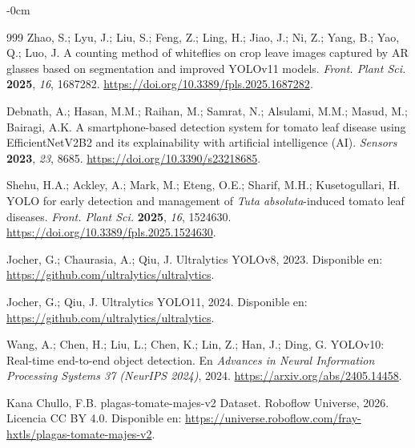 \documentclass[sensors,article,submit,pdftex,moreauthors]{Definitions/mdpi}
\begin{document}
\begin{adjustwidth}{-\extralength}{0cm}
\begin{thebibliography}{999}
Zhao, S.; Lyu, J.; Liu, S.; Feng, Z.; Ling, H.; Jiao, J.; Ni, Z.; Yang, B.; Yao, Q.; Luo, J. A counting method of whiteflies on crop leave images captured by AR glasses based on segmentation and improved YOLOv11 models. {\em Front. Plant Sci.} {\bf 2025}, {\em 16}, 1687282. \url{https://doi.org/10.3389/fpls.2025.1687282}.

Debnath, A.; Hasan, M.M.; Raihan, M.; Samrat, N.; Alsulami, M.M.; Masud, M.; Bairagi, A.K. A smartphone-based detection system for tomato leaf disease using EfficientNetV2B2 and its explainability with artificial intelligence (AI). {\em Sensors} {\bf 2023}, {\em 23}, 8685. \url{https://doi.org/10.3390/s23218685}.

Shehu, H.A.; Ackley, A.; Mark, M.; Eteng, O.E.; Sharif, M.H.; Kusetogullari, H. YOLO for early detection and management of \emph{Tuta absoluta}-induced tomato leaf diseases. {\em Front. Plant Sci.} {\bf 2025}, {\em 16}, 1524630. \url{https://doi.org/10.3389/fpls.2025.1524630}.

Jocher, G.; Chaurasia, A.; Qiu, J. Ultralytics YOLOv8, 2023. Disponible en: \url{https://github.com/ultralytics/ultralytics}.

Jocher, G.; Qiu, J. Ultralytics YOLO11, 2024. Disponible en: \url{https://github.com/ultralytics/ultralytics}.

Wang, A.; Chen, H.; Liu, L.; Chen, K.; Lin, Z.; Han, J.; Ding, G. YOLOv10: Real-time end-to-end object detection. En {\em Advances in Neural Information Processing Systems 37 (NeurIPS 2024)}, 2024. \url{https://arxiv.org/abs/2405.14458}.

Kana Chullo, F.B. plagas-tomate-majes-v2 Dataset. Roboflow Universe, 2026. Licencia CC BY 4.0. Disponible en: \url{https://universe.roboflow.com/fray-hxtls/plagas-tomate-majes-v2}.

\end{thebibliography}
\end{adjustwidth}
\end{document}
